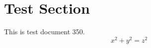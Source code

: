 \documentclass{article}
\begin{document}
\section{Test Section}
This is test document 350.
\begin{equation}
x^2 + y^2 = z^2
\end{equation}
\end{document}
